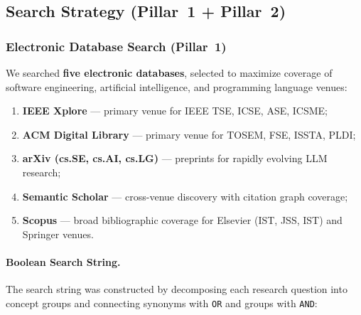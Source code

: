 \subsection{Search Strategy (Pillar~1 + Pillar~2)}
\label{sec:search}

\subsubsection{Electronic Database Search (Pillar~1)}

We searched \textbf{five electronic databases}, selected to maximize coverage of
software engineering, artificial intelligence, and programming language venues:

\begin{enumerate}
  \item \textbf{IEEE Xplore} --- primary venue for IEEE TSE, ICSE, ASE, ICSME;
  \item \textbf{ACM Digital Library} --- primary venue for TOSEM, FSE, ISSTA, PLDI;
  \item \textbf{arXiv (cs.SE, cs.AI, cs.LG)} --- preprints for rapidly evolving LLM research;
  \item \textbf{Semantic Scholar} --- cross-venue discovery with citation graph coverage;
  \item \textbf{Scopus} --- broad bibliographic coverage for Elsevier (IST, JSS, IST) and Springer venues.
\end{enumerate}

\paragraph{Boolean Search String.}
The search string was constructed by decomposing each research question into
concept groups and connecting synonyms with \texttt{OR} and groups with
\texttt{AND}:

\vspace{4pt}
\noindent{}
\vspace{4pt}

